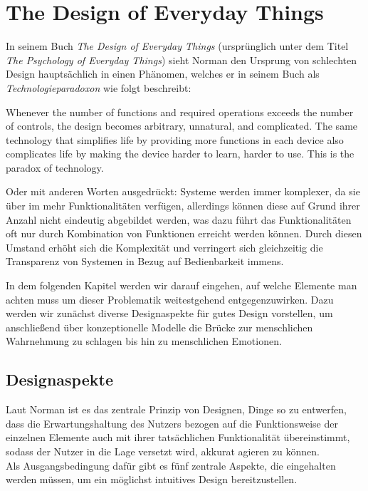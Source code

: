 \documentclass[parskip,headsepline, headtopline, %
footsepline, oneside, 12pt, headings=small]{scrreprt}
\begin{document}
\chapter{The Design of Everyday Things}

In seinem Buch \textit{The Design of Everyday Things}\cite{don} (ursprünglich unter dem Titel \textit{The Psychology of Everyday Things}) sieht Norman den Ursprung von schlechten Design hauptsächlich in einen Phänomen, welches er in seinem Buch als \textit{Technologieparadoxon} wie folgt beschreibt:

\glqq Whenever the number of functions and required operations exceeds the number of controls, the design becomes arbitrary, unnatural, and complicated. 
	The same technology that simplifies life by providing more functions in each device also complicates life by making the device harder to learn, harder to use. This is the paradox of technology.\grqq  \cite[S.31]{don}

Oder mit anderen Worten ausgedrückt: Systeme werden immer komplexer, da sie über im mehr Funktionalitäten verfügen, allerdings können diese auf Grund ihrer Anzahl nicht eindeutig abgebildet werden, was dazu führt das Funktionalitäten oft nur durch Kombination von Funktionen erreicht werden können. Durch diesen Umstand erhöht sich die Komplexität und verringert sich gleichzeitig die Transparenz von Systemen in Bezug auf Bedienbarkeit immens. 

In dem folgenden Kapitel werden wir darauf eingehen, auf welche Elemente man achten muss um dieser Problematik weitestgehend entgegenzuwirken. Dazu werden wir zunächst diverse Designaspekte für gutes Design vorstellen, um anschließend über konzeptionelle Modelle die Brücke zur menschlichen Wahrnehmung zu schlagen bis hin zu menschlichen Emotionen.
 


\section{Designaspekte}
\label{sec:aspekte}

Laut Norman ist es das zentrale Prinzip von Designen, Dinge so zu entwerfen, dass die Erwartungshaltung des Nutzers bezogen auf die Funktionsweise der einzelnen Elemente auch mit ihrer tatsächlichen Funktionalität übereinstimmt, sodass der Nutzer in die Lage versetzt wird, akkurat agieren zu können.\\ 
Als Ausgangsbedingung dafür gibt es fünf zentrale Aspekte, die eingehalten werden müssen, um  ein möglichst intuitives Design bereitzustellen. 
	
\end{document}
